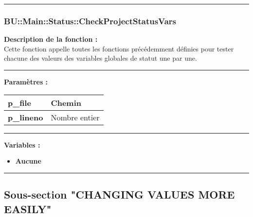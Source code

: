 \documentclass[a4paper,10pt]{article}
\begin{document}

\color{sec3}\par\noindent\rule{\textwidth}{0.4pt}\color{text}

\color{sec3}
\subsubsection{BU::Main::Status::CheckProjectStatusVars}\color{text}

\begin{justify}
    \textbf{Description de la fonction :}\\[1\baselineskip]
    Cette fonction appelle toutes les fonctions précédemment définies pour tester chacune des valeurs des variables globales de statut une par une.
\end{justify}


\par\noindent\rule{\textwidth}{0.4pt}

\begin{justify}
    \textbf{Paramètres :}\\[1\baselineskip]
    \begin{tabular}{|l|l|}
        \hline
        \textbf{\color{vars}p\_file} & Chemin\\
        \hline
        \textbf{\color{vars}p\_lineno} & Nombre entier\\
        \hline
    \end{tabular}
\end{justify}


\par\noindent\rule{\textwidth}{0.4pt}

\begin{justify}
    \textbf{Variables :}
    \begin{itemize}
        \item \textbf{Aucune}
    \end{itemize}
\end{justify}




\color{sec2}\par\noindent\rule{\textwidth}{0.4pt}\color{text}

\color{sec2}
\subsection{Sous-section "CHANGING VALUES MORE EASILY"}\color{text}
\end{document}
